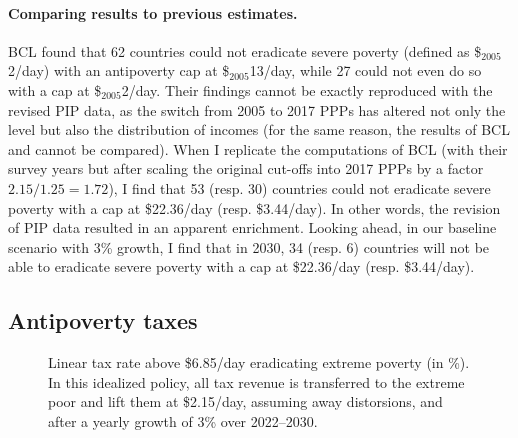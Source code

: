 \paragraph{Comparing results to previous estimates.}
BCL found that 62 countries could not eradicate severe poverty (defined as \$$_\text{2005}$2/day) with an antipoverty cap at \$$_\text{2005}$13/day, while 27 could not even do so with a cap at \$$_\text{2005}$2/day. 
Their findings cannot be exactly reproduced with the revised PIP data, as the switch from 2005 to 2017 PPPs has altered not only the level but also the distribution of incomes (for the same reason, the results of BCL and \cite{ravallion_poorer_2010} cannot be compared). 
When I replicate the computations of BCL (with their survey years but after scaling the original cut-offs into 2017 PPPs by a factor $2.15/1.25 = 1.72$), I find that 53 (resp. 30) 
countries could not eradicate severe poverty with a cap at \$22.36/day (resp. \$3.44/day). 
In other words, the revision of PIP data resulted in an apparent enrichment. %
Looking ahead, in our baseline scenario with 3\% growth, I find that in 2030, 34 (resp. 6) 
countries will not be able to eradicate severe poverty with a cap at \$22.36/day (resp. \$3.44/day).

\subsection{Antipoverty taxes}

\begin{figure}[b!]
  \caption[Anti-\textit{extreme-poverty} tax above \$6.85/day in 2030 after 3\% growth.]{Linear tax rate above \$6.85/day eradicating extreme poverty (in \%). In this idealized policy, all tax revenue is transferred to the extreme poor and lift them at \$2.15/day, assuming away distorsions, and after a yearly growth of 3\% over 2022--2030. 
  }\label{fig:antipoverty_tax_7}
\end{figure}

